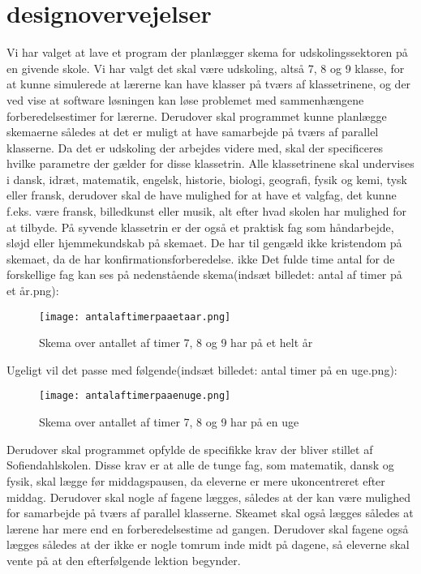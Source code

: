 \documentclass{article}
\begin{document}
\section{designovervejelser}
Vi har valget at lave et program der planlægger skema for udskolingssektoren på en givende skole. Vi har valgt det skal være udskoling, altså 7, 8 og 9 klasse, for at kunne simulerede at lærerne kan have klasser på tværs af klassetrinene, og der ved vise at software løsningen kan løse problemet med sammenhængene forberedelsestimer for lærerne. Derudover skal programmet kunne planlægge skemaerne således at det er muligt at have samarbejde på tværs af parallel klasserne.  Da det er udskoling der arbejdes videre med, skal der specificeres hvilke parametre der gælder for disse klassetrin. Alle klassetrinene skal undervises i dansk, idræt, matematik, engelsk, historie, biologi, geografi, fysik og kemi, tysk eller fransk, derudover skal de have mulighed for at have et valgfag, det kunne f.eks. være fransk, billedkunst eller musik, alt efter hvad skolen har mulighed for at tilbyde. På syvende klassetrin er der også et praktisk fag som håndarbejde, sløjd eller hjemmekundskab på skemaet. De har til gengæld ikke kristendom på skemaet, da de har konfirmationsforberedelse. ikke Det fulde time antal for de forskellige fag kan ses på nedenstående skema(indsæt billedet: antal af timer på et år.png):
\begin{figure}[h!]
\texttt{[image: antalaftimerpaaetaar.png]}
\caption{Skema over antallet af timer 7, 8 og 9 har på et helt år}
\label{Fig: XXX}
\end{figure}

Ugeligt vil det passe med følgende(indsæt billedet: antal timer på en uge.png):
\begin{figure}[h!]
\texttt{[image: antalaftimerpaaenuge.png]}
\caption{Skema over antallet af timer 7, 8 og 9 har på en uge}
\label{Fig: XXX2}
\end{figure}

Derudover skal programmet opfylde de specifikke krav der bliver stillet af Sofiendahlskolen. Disse krav er at alle de tunge fag, som matematik, dansk og fysik, skal lægge før middagspausen, da eleverne er mere ukoncentreret efter middag. Derudover skal nogle af fagene lægges, således at der kan være mulighed for samarbejde på tværs af parallel klasserne. Skeamet skal også lægges således at lærene har mere end en forberedelsestime ad gangen.
Derudover skal fagene også lægges således at der ikke er nogle tomrum inde midt på dagene, så eleverne skal vente på at den efterfølgende lektion begynder.
\end{document}
